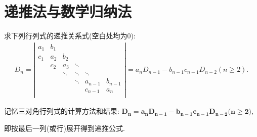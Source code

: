 \documentclass[../../main.tex]{subfiles}%
\begin{document}
\section{递推法与数学归纳法}

\begin{proposition}\label{三对角行列式}
求下列行列式的递推关系式(空白处均为0):
\begin{equation}
\begin{split}
D_n=\left| \begin{matrix}
a_1&		b_1&		&		&		&		\\
c_1&		a_2&		b_2&		&		&		\\
&		c_2&		a_3&		\ddots&		&		\\
&		&		\ddots&		\ddots&		\ddots&		\\
&		&		&		\ddots&		a_{n-1}&		b_{n-1}\\
&		&		&		&		c_{n-1}&		a_n\\
\end{matrix} \right|=a_nD_{n-1}-b_{n-1}c_{n-1}D_{n-2}(n\geqslant 2).
\end{split}
\nonumber
\end{equation}
\end{proposition}
\begin{note}
记忆三对角行列式的计算方法和结果:
$\boldsymbol{D}_{\boldsymbol{n}}=\boldsymbol{a}_{\boldsymbol{n}}\boldsymbol{D}_{\boldsymbol{n}-\boldsymbol{1}}-\boldsymbol{b}_{\boldsymbol{n}-\boldsymbol{1}}\boldsymbol{c}_{\boldsymbol{n}-\boldsymbol{1}}\boldsymbol{D}_{\boldsymbol{n}-\boldsymbol{2}}\boldsymbol{(n}\geqslant \boldsymbol{2)}$,

即按最后一列(或行)展开得到递推公式.
\end{note}
\end{document}
